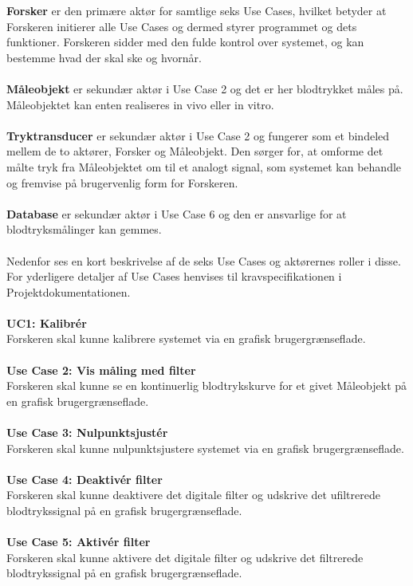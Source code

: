 \textbf{Forsker} er den primære aktør for samtlige seks Use Cases, hvilket betyder at Forskeren initierer alle Use Cases og dermed styrer programmet og dets funktioner. Forskeren sidder med den fulde kontrol over systemet, og kan bestemme hvad der skal ske og hvornår.
\\\\
\textbf{Måleobjekt} er sekundær aktør i Use Case 2 og det er her blodtrykket måles på. Måleobjektet kan enten realiseres in vivo eller in vitro.
\\\\
\textbf{Tryktransducer} er sekundær aktør i Use Case 2 og fungerer som et bindeled mellem de to aktører, Forsker og Måleobjekt. Den sørger for, at omforme det målte tryk fra Måleobjektet om til et analogt signal, som systemet kan behandle og fremvise på brugervenlig form for Forskeren. 
\\\\
\textbf{Database} er sekundær aktør i Use Case 6 og den er ansvarlige for at blodtryksmålinger kan gemmes.
\\\\
Nedenfor ses en kort beskrivelse af de seks Use Cases og aktørernes roller i disse. For yderligere detaljer af Use Cases henvises til kravspecifikationen i Projektdokumentationen.
\\\\
\textbf{UC1: Kalibrér}\\
Forskeren skal kunne kalibrere systemet via en grafisk brugergrænseflade.
\\\\
\textbf{Use Case 2: Vis måling med filter}\\
Forskeren skal kunne se en kontinuerlig blodtrykskurve for et givet Måleobjekt på en grafisk brugergrænseflade. 
\\\\
\textbf{Use Case 3: Nulpunktsjustér}\\
Forskeren skal kunne nulpunktsjustere systemet via en grafisk brugergrænseflade.
\\\\
\textbf{Use Case 4: Deaktivér filter}\\
Forskeren skal kunne deaktivere det digitale filter og udskrive det ufiltrerede blodtrykssignal på en grafisk brugergrænseflade.
\\\\
\textbf{Use Case 5: Aktivér filter}\\
Forskeren skal kunne aktivere det digitale filter og udskrive det filtrerede blodtrykssignal på en grafisk brugergrænseflade.

